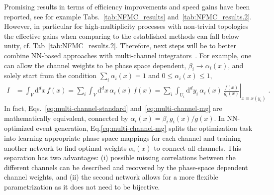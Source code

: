\documentclass[submission,Phys]{SciPost}
\begin{document}
Promising results in terms of efficiency improvements and speed gains have been reported, see for example Tabs.~\ref{tab:NFMC_results} and~\ref{tab:NFMC_results.2}. However, in particular for high-multiplicity processes with non-trivial topologies the effective gains when comparing to the established methods can fall below unity, cf. Tab~\ref{tab:NFMC_results.2}. Therefore, next steps will be to better combine NN-based approaches with multi-channel integrators~\cite{Bothmann:2020ywa,Gao:2020zvv}. For example, one can allow the channel weights to be phase space dependent, $\beta_i\to\alpha_i(x)$, and solely start from the condition $\sum_i \alpha_i(x) = 1$ and $0\le\alpha_i(x)\le1$,
%
\begin{align}
    I &= \int_V\mathrm{d}^d x\,f(x)
    =\sum_i \int_V \mathrm{d}^d x\,\alpha_i(x)\,f(x)
    =\sum_i \int_{U_i}\mathrm{d}^d y_i\,\left.\alpha_i(x)\,\frac{f(x)}{g_i(x)}\right\vert_{x\equiv x(y_i)}\; .
    \label{eq:multi-channel-mg}
\end{align}
%
In fact, Eqs.~\eqref{eq:multi-channel-standard} and~\eqref{eq:multi-channel-mg} are mathematically equivalent, connected by $\alpha_i(x)=\beta_i\, g_i(x)/g(x)$. In NN-optimized event generation, Eq.\eqref{eq:multi-channel-mg} splits the optimization task into learning appropriate phase space mappings for each channel and training another network to find optimal weights $\alpha_i(x)$ to connect all channels. This separation has two advantages: (i) possible missing correlations between the different channels can be described and recovered by the phase-space dependent channel weights, and (ii) the second network allows for a more flexible parametrization as it does not need to be bijective.
\end{document}
